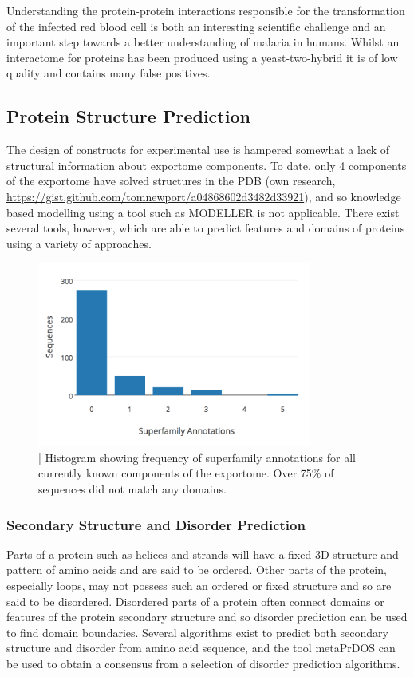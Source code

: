 \documentclass[fleqn,10pt]{article} %
\begin{document}
Understanding the protein-protein interactions responsible for the transformation of the infected red blood cell is both an interesting scientific challenge and an important step towards a better understanding of malaria in humans. Whilst an interactome for \pf proteins has been produced using a yeast-two-hybrid \cite{LaCount2005} it is of low quality and contains many false positives.

\subsection{Protein Structure Prediction}

The design of constructs for experimental use is hampered somewhat a lack of structural information about \pf exportome components. To date, only 4 components of the \pf exportome have solved structures in the PDB (own research, \url{https://gist.github.com/tomnewport/a04868602d3482d33921}), and so knowledge based modelling using a tool such as MODELLER \cite{Eswar2007} is not applicable. There exist several tools, however, which are able to predict features and domains of proteins using a variety of approaches.

\begin{figure}
\includegraphics[width=9cm]{figs/scopresults}
\caption{ | Histogram showing frequency of superfamily annotations for all currently known components of the \pf exportome. Over 75\% of sequences did not match any domains.}
\end{figure}

\subsubsection*{Secondary Structure and Disorder Prediction}

Parts of a protein such as helices and strands will have a fixed 3D structure and pattern of amino acids and are said to be ordered. Other parts of the protein, especially loops, may not possess such an ordered or fixed structure and so are said to be disordered. Disordered parts of a protein often connect domains or features of the protein secondary structure and so disorder prediction can be used to find domain boundaries. Several algorithms exist to predict both secondary structure and disorder from amino acid sequence, and the tool metaPrDOS \cite{Ishida2008} can be used to obtain a consensus from a selection of disorder prediction algorithms.
\end{document}
